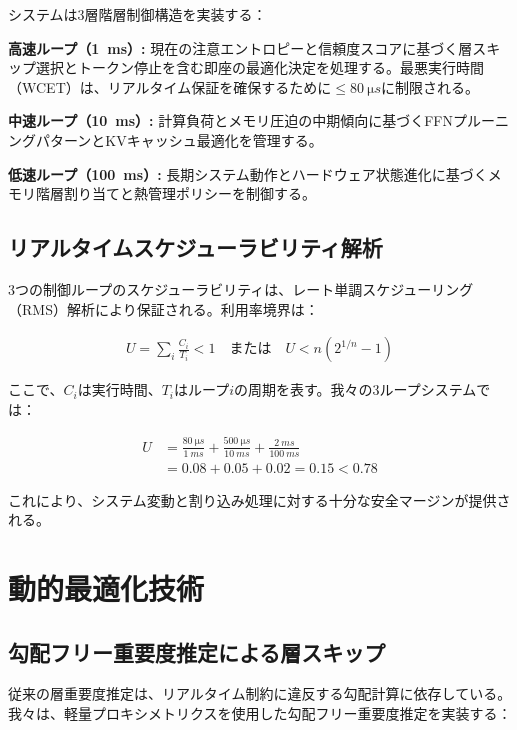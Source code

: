\documentclass[10pt,twocolumn,a4paper]{jarticle}
\begin{document}
システムは3層階層制御構造を実装する：

\textbf{高速ループ（\SI{1}{ms}）:} 現在の注意エントロピーと信頼度スコアに基づく層スキップ選択とトークン停止を含む即座の最適化決定を処理する。最悪実行時間（WCET）は、リアルタイム保証を確保するために$\leq \SI{80}{\micro s}$に制限される。

\textbf{中速ループ（\SI{10}{ms}）:} 計算負荷とメモリ圧迫の中期傾向に基づくFFNプルーニングパターンとKVキャッシュ最適化を管理する。

\textbf{低速ループ（\SI{100}{ms}）:} 長期システム動作とハードウェア状態進化に基づくメモリ階層割り当てと熱管理ポリシーを制御する。

\subsection{リアルタイムスケジューラビリティ解析}

3つの制御ループのスケジューラビリティは、レート単調スケジューリング（RMS）解析により保証される。利用率境界は：

\begin{align}
U = \sum_{i} \frac{C_i}{T_i} < 1 \quad \text{または} \quad U < n(2^{1/n} - 1) \label{eq:rms}
\end{align}

ここで、$C_i$は実行時間、$T_i$はループ$i$の周期を表す。我々の3ループシステムでは：

\begin{align}
U &= \frac{\SI{80}{\micro s}}{\SI{1}{ms}} + \frac{\SI{500}{\micro s}}{\SI{10}{ms}} + \frac{\SI{2}{ms}}{\SI{100}{ms}} \nonumber \\
&= 0.08 + 0.05 + 0.02 = 0.15 < 0.78 \label{eq:utilization}
\end{align}

これにより、システム変動と割り込み処理に対する十分な安全マージンが提供される。

\section{動的最適化技術}

\subsection{勾配フリー重要度推定による層スキップ}

従来の層重要度推定は、リアルタイム制約に違反する勾配計算に依存している。我々は、軽量プロキシメトリクスを使用した勾配フリー重要度推定を実装する：
\end{document}
